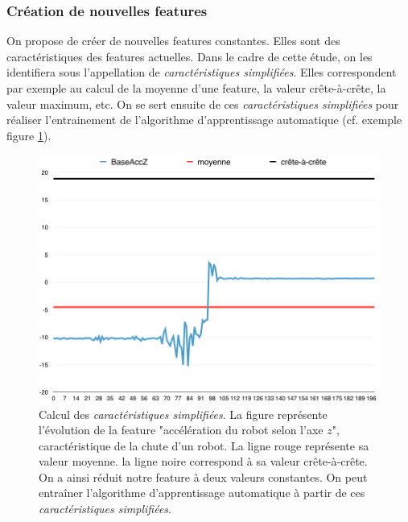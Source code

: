 \subsubsection{Création de nouvelles features}
\label{Automatisation du processus d'investigation: Reconnaissance de motifs: Différentes approches étudiées: Création de nouvelles features}
On propose de créer de nouvelles features constantes. Elles sont des caractéristiques des features actuelles. Dans le cadre de cette étude, on les identifiera sous l'appellation de \emph{caractéristiques simplifiées}. Elles correspondent par exemple au calcul de la moyenne d'une feature, la valeur crête-à-crête, la valeur maximum, etc. On se sert ensuite de ces  \emph{caractéristiques simplifiées} pour réaliser l'entrainement de l'algorithme d'apprentissage automatique (cf. exemple figure \ref{fig:Calcul de nouvelles features}).

\begin{figure}[h]
	\centering\includegraphics[width=12cm]{images/caracteristiques_simples_1.png}
	\caption[Calcul des caractéristiques simplifiées]{Calcul des \emph{caractéristiques simplifiées}. La figure représente l'évolution de la feature "accélération du robot selon l'axe $z$",  caractéristique de la chute d'un robot. La ligne rouge représente sa valeur moyenne. la ligne noire correspond à sa valeur crête-à-crête. On a ainsi réduit notre feature à deux valeurs constantes. On peut  entraîner l'algorithme d'apprentissage automatique à partir de ces \emph{caractéristiques simplifiées}.}
	\label{fig:Calcul de nouvelles features}
\end{figure}

